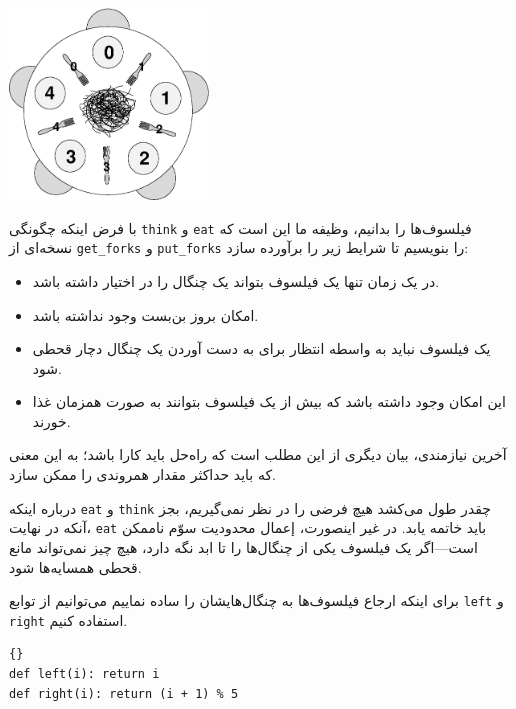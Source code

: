 \documentclass{book}
\begin{document}
\centerline{\includegraphics[height=2in]{table.eps}}

    با فرض اینکه چگونگی {\tt think} و {\tt eat} فیلسوف‌ها را بدانیم، وظیفه ما این است که 
    نسخه‌ای از {\tt get\_forks} و {\tt put\_forks}   را بنویسیم تا شرایط زیر را برآورده سازد:

\begin{itemize}

\item 
    در یک زمان تنها یک فیلسوف بتواند یک چنگال را در اختیار داشته باشد. 

\item 
    امکان بروز بن‌بست وجود نداشته باشد. 

\item 
    یک فیلسوف نباید به واسطه انتظار برای به دست آوردن یک چنگال دچار قحطی شود. 

\item 
    این امکان وجود داشته باشد که بیش از یک فیلسوف بتوانند به صورت همزمان غذا خورند. 

\end{itemize}

    آخرین نیازمندی، بیان دیگری از این مطلب است که راه‌حل باید کارا باشد؛ به این معنی که باید حداکثر مقدار همروندی را ممکن سازد. 

    درباره اینکه {\tt eat} و {\tt think} چقدر طول می‌کشد هیچ فرضی  را در نظر نمی‌گیریم، بجز آنکه در نهایت، {\tt eat}  باید خاتمه یابد. 
    در غیر اینصورت، إعمال محدودیت سوّم ناممکن است---اگر یک فیلسوف یکی از چنگال‌ها را تا ابد نگه دارد، 
    هیچ چیز نمی‌تواند مانع قحطی همسایه‌ها شود. 
    

    برای اینکه ارجاع فیلسوف‌ها به چنگال‌هایشان را ساده نماییم می‌توانیم از توابع {\tt left} و {\tt right} استفاده کنیم. 

\begin{latin}
\begin{lstlisting}[title=\rl{کدام چنگال؟}]{}
def left(i): return i
def right(i): return (i + 1) % 5
\end{lstlisting}
\end{latin}
\end{document}
